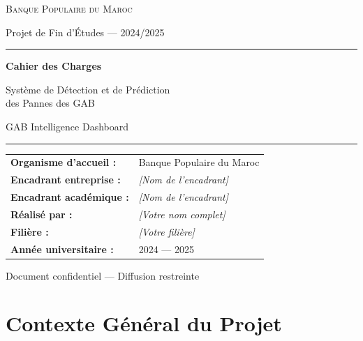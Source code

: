 \documentclass[a4paper,12pt]{report}
\begin{document}
\begin{titlepage}
\centering
\vspace*{1cm}

{\Large\textsc{Banque Populaire du Maroc}}\par
\vspace{0.5cm}
{\large Projet de Fin d'Études — 2024/2025}\par

\vspace{2cm}
\rule{\textwidth}{2pt}\par
\vspace{0.8cm}
{\Huge\bfseries\textcolor{bpmred}{Cahier des Charges}}\par
\vspace{0.5cm}
{\LARGE\textcolor{bpmblue}{Système de Détection et de Prédiction\\des Pannes des GAB}}\par
\vspace{0.3cm}
{\Large GAB Intelligence Dashboard}\par
\vspace{0.8cm}
\rule{\textwidth}{2pt}\par

\vspace{2cm}

\begin{tabular}{ll}
\textbf{Organisme d'accueil :} & Banque Populaire du Maroc \\
\textbf{Encadrant entreprise :} & \textit{[Nom de l'encadrant]} \\
\textbf{Encadrant académique :} & \textit{[Nom de l'encadrant]} \\
\textbf{Réalisé par :} & \textit{[Votre nom complet]} \\
\textbf{Filière :} & \textit{[Votre filière]} \\
\textbf{Année universitaire :} & 2024 — 2025 \\
\end{tabular}

\vfill
{\small Document confidentiel — Diffusion restreinte}
\end{titlepage}

\tableofcontents
\newpage

\chapter{Contexte Général du Projet}
\end{document}
